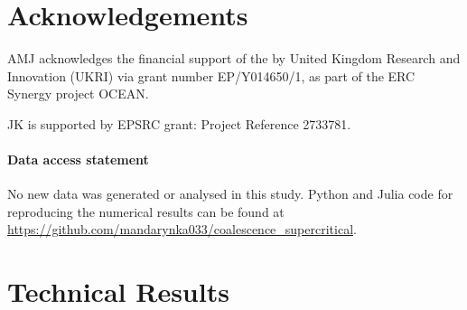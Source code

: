 \documentclass[preprint,3p,12pt]{elsarticle}
\theoremstyle{definition}
\begin{document}
\section*{Acknowledgements}
AMJ acknowledges the financial support of the by United Kingdom Research and Innovation (UKRI) via grant number EP/Y014650/1, as part of the ERC Synergy project OCEAN. 

JK is supported by EPSRC grant: Project Reference 2733781.

\paragraph{Data access statement} No new data was generated or analysed in this study. Python and Julia code for reproducing the numerical results can be found at \url{https://github.com/mandarynka033/coalescence_supercritical}.

\appendix
\section{Technical Results}
\end{document}
